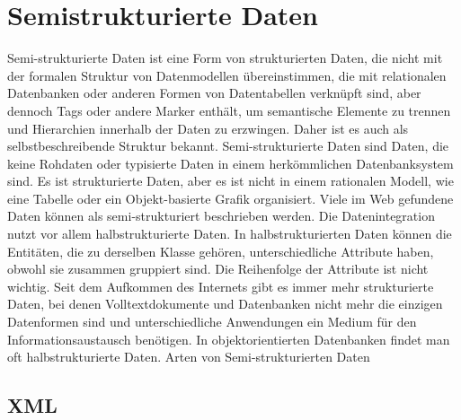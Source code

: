 \section{Semistrukturierte Daten}
Semi-strukturierte Daten ist eine Form von strukturierten Daten, die nicht mit der formalen Struktur von Datenmodellen übereinstimmen, die mit relationalen Datenbanken oder anderen Formen von Datentabellen verknüpft sind, aber dennoch Tags oder andere Marker enthält, um semantische Elemente zu trennen und Hierarchien innerhalb der Daten zu erzwingen. Daher ist es auch als selbstbeschreibende Struktur bekannt.
Semi-strukturierte Daten sind Daten, die keine Rohdaten oder typisierte Daten in einem herkömmlichen Datenbanksystem sind. Es ist strukturierte Daten, aber es ist nicht in einem rationalen Modell, wie eine Tabelle oder ein Objekt-basierte Grafik organisiert. Viele im Web gefundene Daten können als semi-strukturiert beschrieben werden. Die Datenintegration nutzt vor allem halbstrukturierte Daten. \cite{buneman2010}
In halbstrukturierten Daten können die Entitäten, die zu derselben Klasse gehören, unterschiedliche Attribute haben, obwohl sie zusammen gruppiert sind. Die Reihenfolge der Attribute ist nicht wichtig.    
Seit dem Aufkommen des Internets gibt es immer mehr strukturierte Daten, bei denen Volltextdokumente und Datenbanken nicht mehr die einzigen Datenformen sind und unterschiedliche Anwendungen ein Medium für den Informationsaustausch benötigen. In objektorientierten Datenbanken findet man oft halbstrukturierte Daten. \cite{abiteboul2000}
Arten von Semi-strukturierten Daten 

\subsection{XML}

